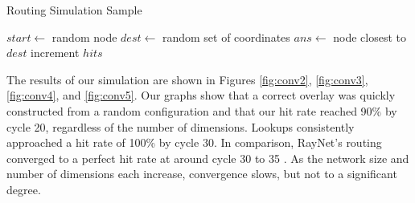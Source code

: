 \begin{algorithm}
	\caption{Routing Simulation Sample}
	\label{alg:routesim}
	\begin{algorithmic}[1]  %
		\State $start \leftarrow$ random node
		\State$dest \leftarrow$ random set of coordinates
		\State $ans \leftarrow$ node closest to $dest$
		\State increment $hits$
		\EndIf
	\end{algorithmic} 
\end{algorithm}

The results of our simulation are shown in Figures \ref{fig:conv2}, \ref{fig:conv3}, \ref{fig:conv4}, and \ref{fig:conv5}.
Our graphs show that a correct overlay was quickly constructed from a random configuration and that our hit rate reached 90\% by cycle 20, regardless of the number of dimensions.
Lookups consistently approached a hit rate of 100\% by cycle 30. 
In comparison, RayNet's routing converged to a perfect hit rate at around cycle 30 to 35 \cite{raynet}.
As the network size and number of dimensions each increase, convergence slows, but not to a significant degree.


